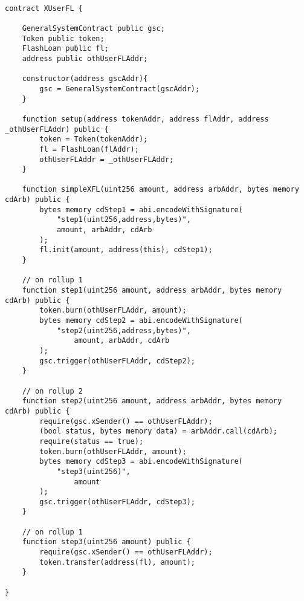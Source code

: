 \begin{lstlisting}[language=Solidity]

contract XUserFL {

    GeneralSystemContract public gsc;
    Token public token;
    FlashLoan public fl;
    address public othUserFLAddr;

    constructor(address gscAddr){ 
        gsc = GeneralSystemContract(gscAddr);
    }

    function setup(address tokenAddr, address flAddr, address _othUserFLAddr) public {
        token = Token(tokenAddr);
        fl = FlashLoan(flAddr);
        othUserFLAddr = _othUserFLAddr;
    }

    function simpleXFL(uint256 amount, address arbAddr, bytes memory cdArb) public {
        bytes memory cdStep1 = abi.encodeWithSignature(
            "step1(uint256,address,bytes)", 
            amount, arbAddr, cdArb
        );
        fl.init(amount, address(this), cdStep1);
    }

    // on rollup 1
    function step1(uint256 amount, address arbAddr, bytes memory cdArb) public {
        token.burn(othUserFLAddr, amount); 
        bytes memory cdStep2 = abi.encodeWithSignature(
            "step2(uint256,address,bytes)", 
                amount, arbAddr, cdArb
        );        
        gsc.trigger(othUserFLAddr, cdStep2);
    }

    // on rollup 2
    function step2(uint256 amount, address arbAddr, bytes memory cdArb) public {
        require(gsc.xSender() == othUserFLAddr);
        (bool status, bytes memory data) = arbAddr.call(cdArb);
        require(status == true);
        token.burn(othUserFLAddr, amount);
        bytes memory cdStep3 = abi.encodeWithSignature(
            "step3(uint256)", 
                amount
        );
        gsc.trigger(othUserFLAddr, cdStep3);
    }

    // on rollup 1
    function step3(uint256 amount) public {
        require(gsc.xSender() == othUserFLAddr);
        token.transfer(address(fl), amount);
    }

}

\end{lstlisting}
